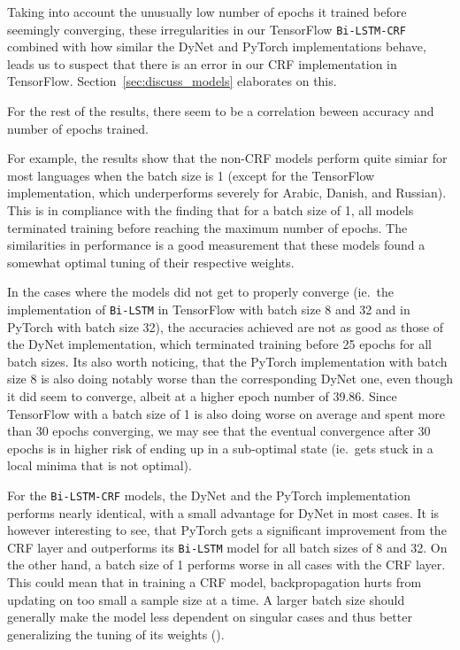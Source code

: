 Taking into account the unusually low number of epochs it trained before
seemingly converging, these irregularities in our TensorFlow
\texttt{Bi-LSTM-CRF} combined with how similar the DyNet and PyTorch
implementations behave, leads us to suspect that there is an error in our CRF
implementation in TensorFlow. Section~\ref{sec:discuss_models} elaborates on this.

For the rest of the results, there seem to be a correlation beween accuracy and
number of epochs trained.

For example, the results show that the non-CRF models perform quite simiar for
most languages when the batch size is 1 (except for the TensorFlow
implementation, which underperforms severely for Arabic, Danish, and Russian).
This is in compliance with the finding that for a batch size of 1, all models
terminated training before reaching the maximum number of epochs. The
similarities in performance is a good measurement that these models found a
somewhat optimal tuning of their respective weights.

In the cases where the models did not get to properly converge (ie.\ the
implementation of \texttt{Bi-LSTM} in TensorFlow with batch size 8 and 32 and in
PyTorch with batch size 32), the accuracies achieved are not as good as those of
the DyNet implementation, which terminated training before 25 epochs for
all batch sizes. Its also worth noticing, that the PyTorch implementation with
batch size 8 is also doing notably worse than the corresponding DyNet one, even
though it did seem to converge, albeit at a higher epoch number of 39.86. Since
TensorFlow with a batch size of 1 is also doing worse on average and spent more
than 30 epochs converging, we may see that the eventual convergence after 30
epochs is in higher risk of ending up in a sub-optimal state (ie.\ gets stuck in
a local minima that is not optimal).

For the \texttt{Bi-LSTM-CRF} models, the DyNet and the PyTorch implementation
performs nearly identical, with a small advantage for DyNet in most cases. It is
however interesting to see, that PyTorch gets a significant improvement from the
CRF layer and outperforms its \texttt{Bi-LSTM} model for all batch sizes of 8
and 32. On the other hand, a batch size of 1 performs worse in all cases with
the CRF layer. This could mean that in training a CRF model, backpropagation
hurts from updating on too small a sample size at a time. A larger batch size
should generally make the model less dependent on singular cases and thus better
generalizing the tuning of its weights (\cite{falcon2018lstms}).

